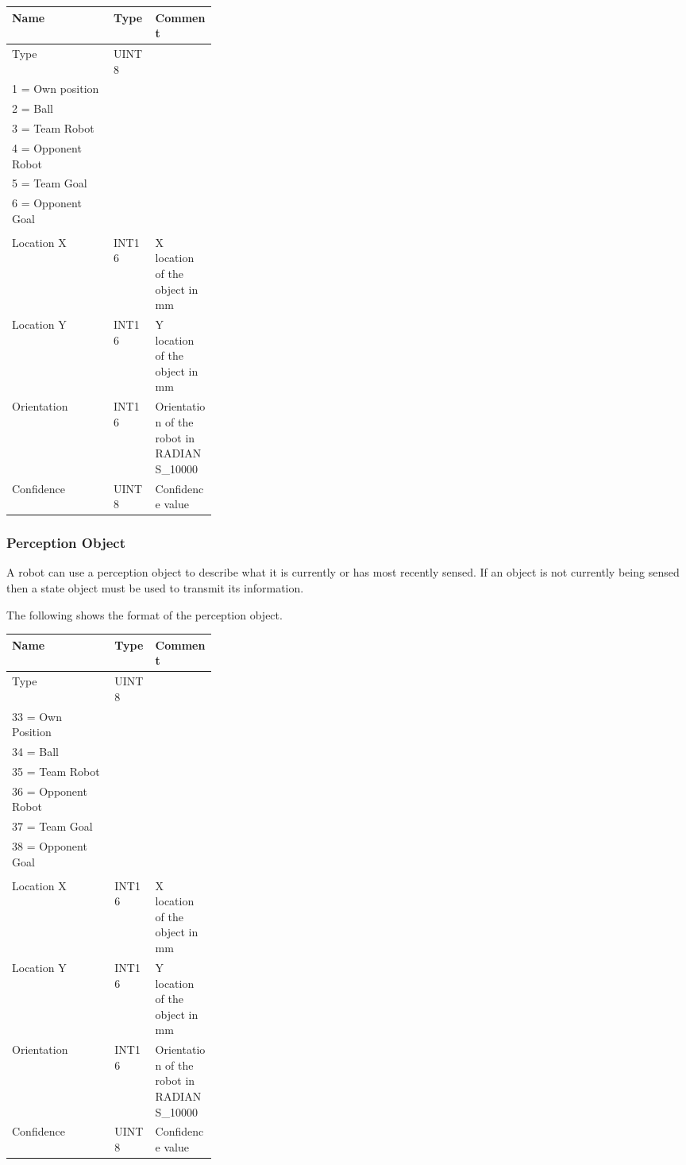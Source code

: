 \documentclass[12pt]{hurocup}
\begin{document}
\begin{center}
\begin{tabular}[t]{|l|l|p{0.3\linewidth}|}
  \hline
  Name & Type & Comment \\
  \hline
  Type          & UINT8 & 
  \begin{minipage}[t]{\linewidth}
    0 = UNDEFINED\\
    1 = Own position\\
    2 = Ball\\
    3 = Team Robot \\
    4 = Opponent Robot\\
    5 = Team Goal\\
    6 = Opponent Goal\\
  \end{minipage}\\
  Location X & INT16 & X location of the object in mm\\
  Location Y & INT16 & Y location of the object in mm\\
  Orientation & INT16 & Orientation of the robot in RADIANS\_10000\\
  Confidence & UINT8 & Confidence value\\
  \hline
\end{tabular}
\end{center}

\subsubsection*{Perception Object}

A robot can use a perception object to describe what it is currently
or has most recently sensed. If an object is not currently being
sensed then a state object must be used to transmit its information.

The following shows the format of the perception object.

\begin{center}
\begin{tabular}[t]{|l|l|p{0.3\linewidth}|}
  \hline
  Name & Type & Comment \\
  \hline
  Type          & UINT8 & 
  \begin{minipage}[t]{\linewidth}
    32 = UNDEFINED\\
    33 = Own Position\\
    34 = Ball\\
    35 = Team Robot \\
    36 = Opponent Robot\\
    37 = Team Goal\\
    38 = Opponent Goal\\
  \end{minipage}\\
  Location X & INT16 & X location of the object in mm\\
  Location Y & INT16 & Y location of the object in mm\\
  Orientation & INT16 & Orientation of the robot in RADIANS\_10000\\
  Confidence & UINT8 & Confidence value\\
  \hline
\end{tabular}
\end{center}
\end{document}
